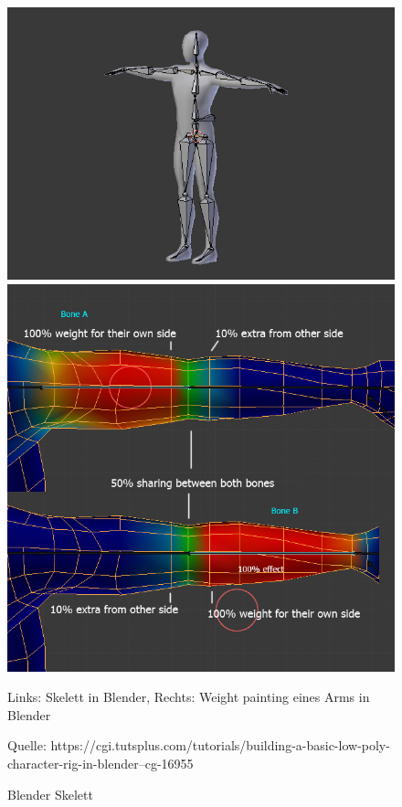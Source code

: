 \begin{figure}
	\centering
	\begin{minipage}{0.49\textwidth}
		\includegraphics[width=\textwidth]{02theorie/skeleton.jpg}
	\end{minipage}
	\hfill
	\begin{minipage}{0.49\textwidth}
		\includegraphics[width=\textwidth]{02theorie/weightpainting.jpg}
	\end{minipage}

	
	Links: Skelett in Blender, Rechts: Weight painting eines Arms in Blender 
	
	Quelle: https://cgi.tutsplus.com/tutorials/building-a-basic-low-poly-character-rig-in-blender--cg-16955
	\caption{Blender Skelett}\label{Img:Skeleton}
\end{figure}
